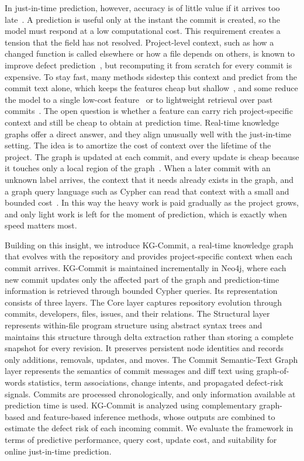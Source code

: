\documentclass[final,5p,times,twocolumn]{elsarticle}
\theoremstyle{plain}
\begin{document}
In just-in-time prediction, however, accuracy is of little value if it arrives too late~\cite{kamei2013large}. A prediction is useful only at the instant the commit is created, so the model must respond at a low computational cost. This requirement creates a tension that the field has not resolved. Project-level context, such as how a changed function is called elsewhere or how a file depends on others, is known to improve defect prediction~\cite{zimmermann2009cross,nam2013transfer}, but recomputing it from scratch for every commit is expensive. To stay fast, many methods sidestep this context and predict from the commit text alone, which keeps the features cheap but shallow~\cite{hoang2019deepjit,hoang2020cc2vec,pornprasit2021jitline}, and some reduce the model to a single low-cost feature~\cite{zeng2021deep} or to lightweight retrieval over past commits~\cite{sahar2024irjit}. The open question is whether a feature can carry rich project-specific context and still be cheap to obtain at prediction time. Real-time knowledge graphs offer a direct answer, and they align unusually well with the just-in-time setting. The idea is to amortize the cost of context over the lifetime of the project. The graph is updated at each commit, and every update is cheap because it touches only a local region of the graph~\cite{zhao2023incremental}. When a later commit with an unknown label arrives, the context that it needs already exists in the graph, and a graph query language such as Cypher can read that context with a small and bounded cost~\cite{francis2018cypher,angles2017foundations}. In this way the heavy work is paid gradually as the project grows, and only light work is left for the moment of prediction, which is exactly when speed matters most.

Building on this insight, we introduce KG-Commit, a real-time knowledge graph that evolves with the repository and provides project-specific context when each commit arrives. KG-Commit is maintained incrementally in Neo4j, where each new commit updates only the affected part of the graph and prediction-time information is retrieved through bounded Cypher queries. Its representation consists of three layers. The Core layer captures repository evolution through commits, developers, files, issues, and their relations. The Structural layer represents within-file program structure using abstract syntax trees and maintains this structure through delta extraction rather than storing a complete snapshot for every revision. It preserves persistent node identities and records only additions, removals, updates, and moves. The Commit Semantic-Text Graph layer represents the semantics of commit messages and diff text using graph-of-words statistics, term associations, change intents, and propagated defect-risk signals. Commits are processed chronologically, and only information available at prediction time is used. KG-Commit is analyzed using complementary graph-based and feature-based inference methods, whose outputs are combined to estimate the defect risk of each incoming commit. We evaluate the framework in terms of predictive performance, query cost, update cost, and suitability for online just-in-time prediction.
\end{document}
